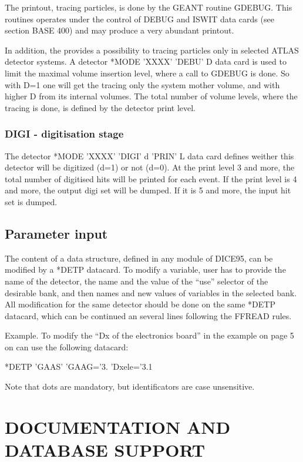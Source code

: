 The printout, tracing particles, is done by the GEANT routine GDEBUG.
This routines operates under the control of DEBUG and ISWIT data cards 
(see section BASE 400) and may produce a very abundant printout.

In addition, the \asi provides a possibility to tracing particles
only in selected ATLAS detector systems.
A detector *MODE 'XXXX' 'DEBU' D  data card is used 
to limit the maximal volume insertion level, 
where a call to GDEBUG is done.
So with D=1 one will get the tracing only the system mother volume,
and with higher D from its internal volumes.
The total number of volume levels, where the tracing is done,
is defined by the detector print level.

\subsubsection{DIGI - digitisation stage}

The detector *MODE 'XXXX' 'DIGI' d 'PRIN' L data card defines weither
this detector will be digitized (d=1) or not (d=0).
At the print level 3 and more, the total number of digitised hits will be printed
for each event.
If the print level is 4 and more, the output digi set will be dumped.
If it  is 5 and more, the input hit set is dumped.

\subsection{Parameter input}

The content of a data structure, defined in any module of DICE95,
can be modified by a *DETP datacard. To modify a variable, user has to
provide the name of the detector, the name and the value of the ``use''
selector of the desirable bank, and then  names and new values
of variables in the selected bank. All modification for the same
detector should be done on the same *DETP datacard, which
can be continued an several lines following the FFREAD rules.

Example. To modify the ``Dx of the electronics board'' in the example
on page 5 on can use the following datacard:
\begin{center}
*DETP 'GAAS' 'GAAG='3. 'Dxele='3.1
\end{center}
Note that dots are mandatory,
but identificators are case unsensitive.

\section{DOCUMENTATION AND DATABASE SUPPORT}

